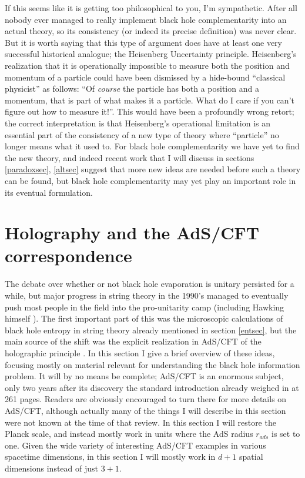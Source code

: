 \documentclass[12pt]{article}
\begin{document}
If this seems like it is getting too philosophical to you, I'm sympathetic.  After all nobody ever managed to really implement black hole complementarity into an actual theory, so its consistency (or indeed its precise definition) was never clear.  But it is worth saying that this type of argument does have at least one very successful historical analogue; the Heisenberg Uncertainty principle.  Heisenberg's realization that it is operationally impossible to measure both the position and momentum of a particle could have been dismissed by a hide-bound ``classical physicist'' as follows: ``Of \textit{course} the particle has both a position and a momentum, that is part of what makes it a particle.  What do I care if you can't figure out how to measure it!''.  This would have been a profoundly wrong retort; the correct interpretation is that Heisenberg's operational limitation is an essential part of the consistency of a new type of theory where ``particle'' no longer means what it used to.  For black hole complementarity we have yet to find the new theory, and indeed recent work that I will discuss in sections \ref{paradoxsec}, \ref{altsec} suggest that more new ideas are needed before such a theory can be found, but black hole complementarity may yet play an important role in its eventual formulation.

  
\section{Holography and the AdS/CFT correspondence}\label{adssec}
The debate over whether or not black hole evaporation is unitary persisted for a while, but major progress in string theory in the 1990's managed to eventually push most people in the field into the pro-unitarity camp (including Hawking himself \cite{Hawking:2005kf}).  The first important part of this was the microscopic calculations of black hole entropy in string theory already mentioned in section \ref{entsec}, but the main source of the shift was the explicit realization in AdS/CFT \cite{Maldacena:1997re,Witten:1998qj,Gubser:1998bc} of the holographic principle \cite{tHooft:1993gx,Susskind:1994vu}.  In this section I give a brief overview of these ideas, focusing mostly on material relevant for understanding the black hole information problem.  It will by no means be complete; AdS/CFT is an enormous subject, only two years after its discovery the standard introduction \cite{Aharony:1999ti} already weighed in at 261 pages.  Readers are obviously encouraged to turn there for more details on AdS/CFT, although actually many of the things I will describe in this section were not known at the time of that review.  In this section I will restore the Planck scale, and instead mostly work in units where the AdS radius $r_{ads}$ is set to one.  Given the wide variety of interesting AdS/CFT examples in various spacetime dimensions, in this section I will mostly work in $d+1$ spatial dimensions instead of just $3+1$.
\end{document}
